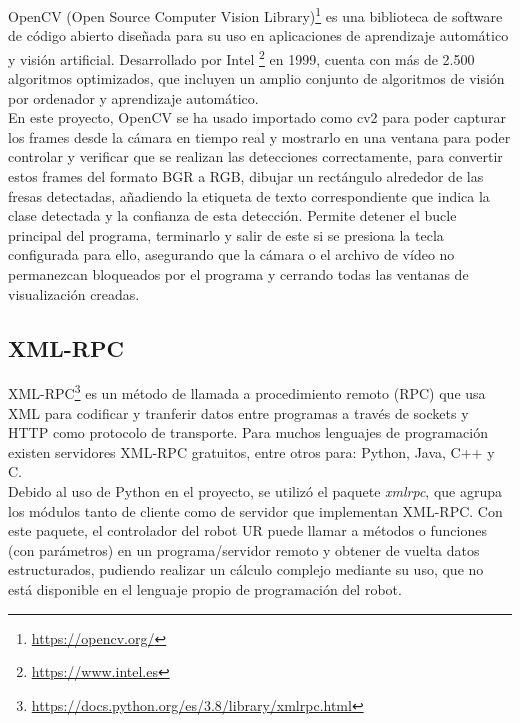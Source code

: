 OpenCV (Open Source Computer Vision Library)\footnote{\url{https://opencv.org/}} es una biblioteca de software de código abierto diseñada para su uso en aplicaciones de aprendizaje automático y visión artificial. Desarrollado por Intel \footnote{\url{https://www.intel.es}} en 1999, cuenta con más de 2.500 algoritmos optimizados, que incluyen un amplio conjunto de algoritmos de visión por ordenador y aprendizaje automático.\\ %

En este proyecto, OpenCV se ha usado importado como cv2 para poder capturar los frames desde la cámara en tiempo real y mostrarlo en una ventana para poder controlar y verificar que se realizan las detecciones correctamente, para convertir estos frames del formato BGR a RGB, dibujar un rectángulo alrededor de las fresas detectadas, añadiendo la etiqueta de texto correspondiente que indica la clase detectada y la confianza de esta detección. Permite detener el bucle principal del programa, terminarlo y salir de este si se presiona la tecla configurada para ello, asegurando que la cámara o el archivo de vídeo no permanezcan bloqueados por el programa y cerrando todas las ventanas de visualización creadas.

\subsection{XML-RPC}
\label{sec:XMLRPC}

XML-RPC\footnote{\url{https://docs.python.org/es/3.8/library/xmlrpc.html}} es un método de llamada a procedimiento remoto (RPC) que usa XML para codificar y tranferir datos entre programas a través de sockets y HTTP como protocolo de transporte. Para muchos lenguajes de programación existen servidores XML-RPC gratuitos, entre otros para: Python, Java, C++ y C.\\

Debido al uso de Python en el proyecto, se utilizó el paquete \textit{xmlrpc}, que agrupa los módulos tanto de cliente como de servidor que implementan XML-RPC. Con este paquete, el controlador del robot UR puede llamar a métodos o funciones (con parámetros) en un programa/servidor remoto y obtener de vuelta datos estructurados, pudiendo realizar un cálculo complejo mediante su uso, que no está disponible en el lenguaje propio de programación del robot.

